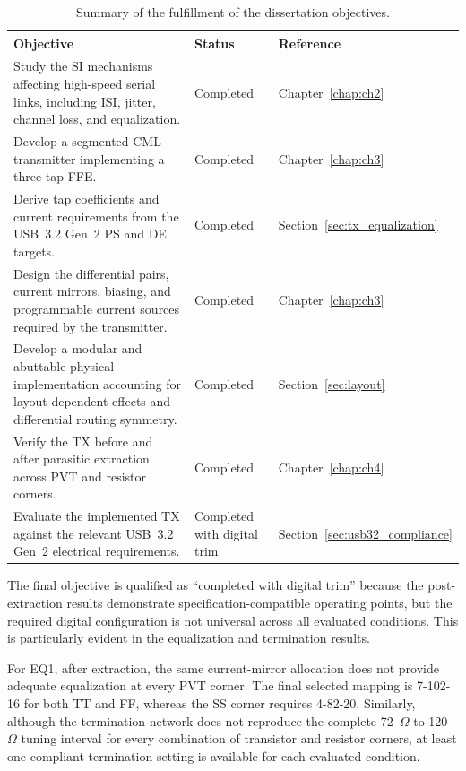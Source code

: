 \begin{table}[!ht]
\centering
\caption{Summary of the fulfillment of the dissertation objectives.}
\label{tab:objectives_summary}
\begin{tabular}{p{} p{} p{}}
\hline
\textbf{Objective} & \textbf{Status} & \textbf{Reference} \\
\hline
Study the \ac{SI} mechanisms affecting high-speed serial links, including \ac{ISI}, jitter, channel loss, and equalization. &
Completed &
Chapter~\ref{chap:ch2} \\
Develop a segmented \ac{CML} transmitter implementing a three-tap \ac{FFE}. &
Completed &
Chapter~\ref{chap:ch3} \\
Derive tap coefficients and current requirements from the \ac{USB}~3.2 Gen~2 \ac{PS} and \ac{DE} targets. &
Completed &
Section~\ref{sec:tx_equalization} \\
Design the differential pairs, current mirrors, biasing, and programmable current sources required by the transmitter. &
Completed &
Chapter~\ref{chap:ch3} \\
Develop a modular and abuttable physical implementation accounting for layout-dependent effects and differential routing symmetry. &
Completed &
Section~\ref{sec:layout} \\
Verify the \ac{TX} before and after parasitic extraction across \ac{PVT} and resistor corners. &
Completed &
Chapter~\ref{chap:ch4} \\
Evaluate the implemented \ac{TX} against the relevant \ac{USB}~3.2 Gen~2 electrical requirements. &
Completed with digital trim &
Section~\ref{sec:usb32_compliance}\\
\hline
\end{tabular}
\end{table}

The final objective is qualified as ``completed with digital trim'' because the post-extraction results demonstrate specification-compatible operating points, but the required digital configuration is not universal across all evaluated conditions. This is particularly evident in the equalization and termination results.

For EQ1, after extraction, the same current-mirror allocation does not provide adequate equalization at every PVT corner. The final selected mapping is 7-102-16 for both \ac{TT} and \ac{FF}, whereas the \ac{SS} corner requires 4-82-20. Similarly, although the termination network does not reproduce the complete 72~$\Omega$ to 120~$\Omega$ tuning interval for every combination of transistor and resistor corners, at least one compliant termination setting is available for each evaluated condition.

